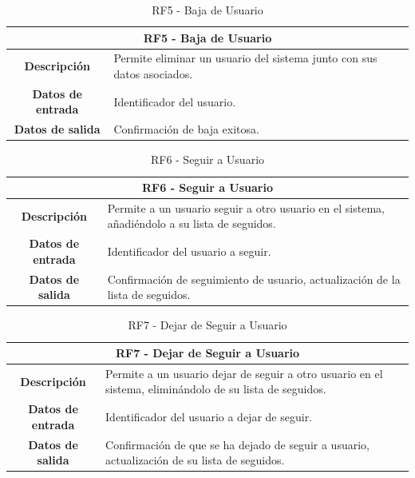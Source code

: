 \begin{table}[H]
    \centering
    \begin{tabular}{|c|p{10cm}|}
        \hline
        \multicolumn{2}{|c|}{\textbf{RF5 - Baja de Usuario}}                                               \\
        \hline
        \textbf{Descripción}      & Permite eliminar un usuario del sistema junto con sus datos asociados. \\
        \hline
        \textbf{Datos de entrada} & Identificador del usuario.                                             \\
        \hline
        \textbf{Datos de salida}  & Confirmación de baja exitosa.                                          \\
        \hline
    \end{tabular}
    \caption{RF5 - Baja de Usuario}
\end{table}

\begin{table}[H]
    \centering
    \begin{tabular}{|c|p{10cm}|}
        \hline
        \multicolumn{2}{|c|}{\textbf{RF6 - Seguir a Usuario}}                                                                     \\
        \hline
        \textbf{Descripción}      & Permite a un usuario seguir a otro usuario en el sistema, añadiéndolo a su lista de seguidos. \\
        \hline
        \textbf{Datos de entrada} & Identificador del usuario a seguir.                                                           \\
        \hline
        \textbf{Datos de salida}  & Confirmación de seguimiento de usuario, actualización de la lista de seguidos.                \\
        \hline
    \end{tabular}
    \caption{RF6 - Seguir a Usuario}
\end{table}

\begin{table}[H]
    \centering
    \begin{tabular}{|c|p{10cm}|}
        \hline
        \multicolumn{2}{|c|}{\textbf{RF7 - Dejar de Seguir a Usuario}}                                                                       \\
        \hline
        \textbf{Descripción}      & Permite a un usuario dejar de seguir a otro usuario en el sistema, eliminándolo de su lista de seguidos. \\
        \hline
        \textbf{Datos de entrada} & Identificador del usuario a dejar de seguir.                                                             \\
        \hline
        \textbf{Datos de salida}  & Confirmación de que se ha dejado de seguir a usuario, actualización de su lista de seguidos.             \\
        \hline
    \end{tabular}
    \caption{RF7 - Dejar de Seguir a Usuario}
\end{table}

